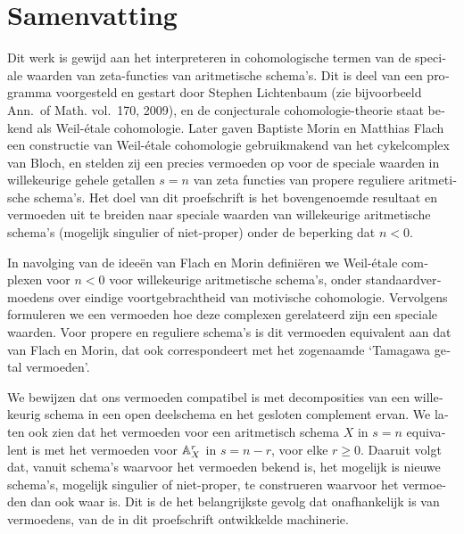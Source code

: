 \chapter*{Samenvatting}

\begin{otherlanguage}{dutch}
  Dit werk is gewijd aan het interpreteren in cohomologische termen van de
  speciale waarden van zeta-functies van aritmetische schema's. Dit is deel van
  een programma voorgesteld en gestart door Stephen Lichtenbaum
  (zie bijvoorbeeld Ann.~of Math. vol.~170, 2009), en de conjecturale
  cohomologie-theorie staat bekend als Weil-étale cohomologie. Later gaven
  Baptiste Morin en Matthias Flach een constructie van Weil-étale cohomologie
  gebruikmakend van het cykelcomplex van Bloch, en stelden zij een precies
  vermoeden op voor de speciale waarden in willekeurige gehele getallen $s=n$
  van zeta functies van propere reguliere aritmetische schema's. Het doel van
  dit proefschrift is het bovengenoemde resultaat en vermoeden uit te breiden
  naar speciale waarden van willekeurige aritmetische schema's (mogelijk
  singulier of niet-proper) onder de beperking dat $n<0$.

  In navolging van de ideeën van Flach en Morin definiëren we Weil-étale
  complexen voor $n<0$ voor willekeurige aritmetische schema's, onder
  standaardvermoedens over eindige voortgebrachtheid van motivische
  cohomologie. Vervolgens formuleren we een vermoeden hoe deze complexen
  gerelateerd zijn een speciale waarden. Voor propere en reguliere schema's is
  dit vermoeden equivalent aan dat van Flach en Morin, dat ook correspondeert
  met het zogenaamde `Tamagawa getal vermoeden'.

  We bewijzen dat ons vermoeden compatibel is met decomposities van een
  willekeurig schema in een open deelschema en het gesloten complement ervan.
  We laten ook zien dat het vermoeden voor een aritmetisch schema $X$ in $s=n$
  equivalent is met het vermoeden voor $\AA^r_X$ in $s=n-r$, voor elke
  $r\geq0$. Daaruit volgt dat, vanuit schema's waarvoor het vermoeden bekend is,
  het mogelijk is nieuwe schema's, mogelijk singulier of niet-proper, te
  construeren waarvoor het vermoeden dan ook waar is. Dit is de het
  belangrijkste gevolg dat onafhankelijk is van vermoedens, van de in dit
  proefschrift ontwikkelde machinerie.
\end{otherlanguage}
